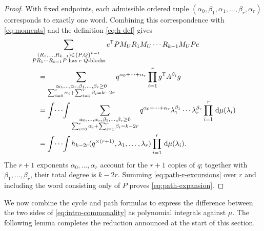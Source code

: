\documentclass[11pt]{article}
\theoremstyle{remark}
\numberwithin{equation}{section}
\newcommand{\dd}{\,\mathrm d}
\newcommand{\rep}[2]{#1^{\times #2}}
\begin{document}
\begin{proof}
  With fixed endpoints, each admissible ordered tuple
  $(\alpha_0,\beta_1,\alpha_1,\ldots,\beta_r,\alpha_r)$ corresponds to exactly one word.
  Combining this correspondence with \eqref{eq:moments} and the definition \eqref{eq:h-def} gives
  \begin{align}
    &\sum_{\substack{(R_1,\ldots,R_{k-1})\in\{P,Q\}^{k-1}\\
                     PR_1\cdots R_{k-1}P
                     \text{ has }r\text{ $Q$-blocks}}}
      e^{\mathsf T}P M_U R_1M_U\cdots R_{k-1}M_UPe\notag\\
    &\quad=\sum_{\substack{\alpha_0,\ldots,\alpha_r,\beta_1,\ldots,\beta_r\ge0\\
                         \sum_{i=0}^r\alpha_i+
                         \sum_{i=1}^r\beta_i=k-2r}}
      q^{\alpha_0+\cdots+\alpha_r}
      \prod_{i=1}^rg^{\mathsf T}A^{\beta_i}g\notag\\
    &\quad=\int\!\cdots\!\int
      \sum_{\substack{\alpha_0,\ldots,\alpha_r,\beta_1,\ldots,\beta_r\ge0\\
                      \sum_{i=0}^r\alpha_i+
                      \sum_{i=1}^r\beta_i=k-2r}}
      q^{\alpha_0+\cdots+\alpha_r}
      \lambda_1^{\beta_1}\cdots\lambda_r^{\beta_r}
      \prod_{i=1}^r\dd\mu(\lambda_i)\notag\\
    &\quad=\int\!\cdots\!\int
      h_{k-2r}(\rep q{(r+1)},\lambda_1,\ldots,\lambda_r)
      \prod_{i=1}^r\dd\mu(\lambda_i).
    \label{eq:path-r-excursions}
  \end{align}
  The $r+1$ exponents $\alpha_0,\ldots,\alpha_r$ account for the $r+1$ copies of $q$; together with $\beta_1,\ldots,\beta_r$, their total degree is $k-2r$.
  Summing \eqref{eq:path-r-excursions} over $r$ and including the word consisting only of $P$ proves \eqref{eq:path-expansion}.
\end{proof}

We now combine the cycle and path formulas to express the difference between the two sides of \eqref{eq:intro-commonality} as polynomial integrals against $\mu$.
The following lemma completes the reduction announced at the start of this section.
\end{document}
